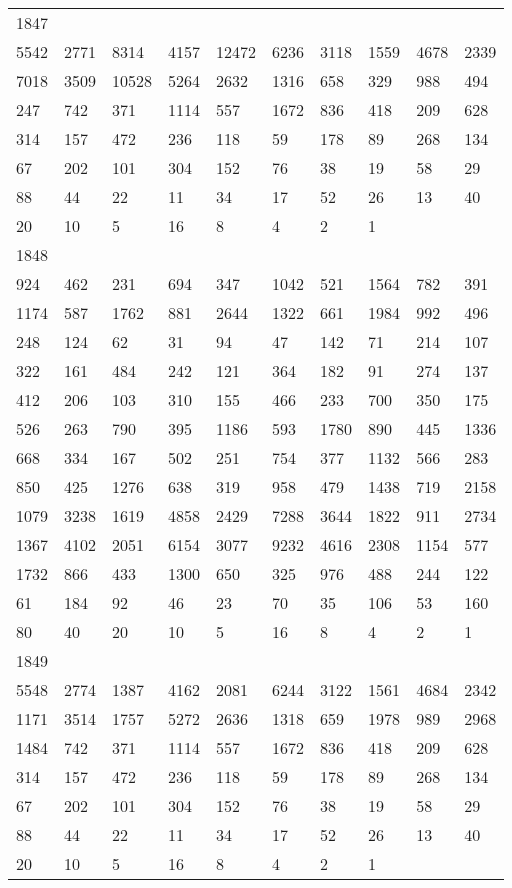 \begin{longtable}{*{10}{l}}
1847&&&&&&&&&\\
5542& 2771& 8314& 4157& 12472& 6236& 3118& 1559& 4678& 2339\\
7018& 3509& 10528& 5264& 2632& 1316& 658& 329& 988& 494\\
247& 742& 371& 1114& 557& 1672& 836& 418& 209& 628\\
314& 157& 472& 236& 118& 59& 178& 89& 268& 134\\
67& 202& 101& 304& 152& 76& 38& 19& 58& 29\\
88& 44& 22& 11& 34& 17& 52& 26& 13& 40\\
20& 10& 5& 16& 8& 4& 2& 1& \\

1848&&&&&&&&&\\
924& 462& 231& 694& 347& 1042& 521& 1564& 782& 391\\
1174& 587& 1762& 881& 2644& 1322& 661& 1984& 992& 496\\
248& 124& 62& 31& 94& 47& 142& 71& 214& 107\\
322& 161& 484& 242& 121& 364& 182& 91& 274& 137\\
412& 206& 103& 310& 155& 466& 233& 700& 350& 175\\
526& 263& 790& 395& 1186& 593& 1780& 890& 445& 1336\\
668& 334& 167& 502& 251& 754& 377& 1132& 566& 283\\
850& 425& 1276& 638& 319& 958& 479& 1438& 719& 2158\\
1079& 3238& 1619& 4858& 2429& 7288& 3644& 1822& 911& 2734\\
1367& 4102& 2051& 6154& 3077& 9232& 4616& 2308& 1154& 577\\
1732& 866& 433& 1300& 650& 325& 976& 488& 244& 122\\
61& 184& 92& 46& 23& 70& 35& 106& 53& 160\\
80& 40& 20& 10& 5& 16& 8& 4& 2& 1\\

1849&&&&&&&&&\\
5548& 2774& 1387& 4162& 2081& 6244& 3122& 1561& 4684& 2342\\
1171& 3514& 1757& 5272& 2636& 1318& 659& 1978& 989& 2968\\
1484& 742& 371& 1114& 557& 1672& 836& 418& 209& 628\\
314& 157& 472& 236& 118& 59& 178& 89& 268& 134\\
67& 202& 101& 304& 152& 76& 38& 19& 58& 29\\
88& 44& 22& 11& 34& 17& 52& 26& 13& 40\\
20& 10& 5& 16& 8& 4& 2& 1& \\


\end{longtable}

